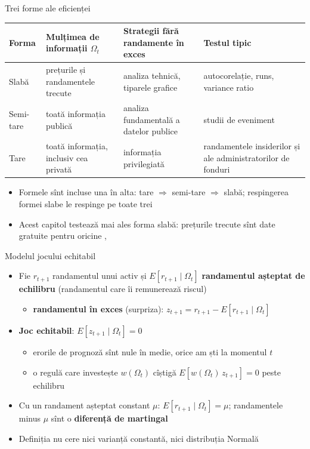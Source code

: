 \begin{frame}{Trei forme ale eficienței}
\itemsize{\small}
\begin{center}
\footnotesize
\begin{tabular}{>{\raggedright\arraybackslash}p{1.8cm}>{\raggedright\arraybackslash}p{3.2cm}>{\raggedright\arraybackslash}p{3.0cm}>{\raggedright\arraybackslash}p{2.9cm}}
\toprule
\textbf{Forma} & \textbf{Mulțimea de informații $\Omega_t$} & \textbf{Strategii fără randamente în exces} & \textbf{Testul tipic} \\
\midrule
Slabă & prețurile și randamentele trecute & analiza tehnică, tiparele grafice & autocorelație, runs, variance ratio \\
Semi-tare & toată informația publică & analiza fundamentală a datelor publice & studii de eveniment \\
Tare & toată informația, inclusiv cea privată & informația privilegiată & randamentele insiderilor și ale administratorilor de fonduri \\
\bottomrule
\end{tabular}
\end{center}
\begin{itemize}
    \item Formele sînt incluse una în alta: tare $\Rightarrow$ semi-tare $\Rightarrow$ slabă; respingerea formei slabe le respinge pe toate trei
    \item Acest capitol testează mai ales forma slabă: prețurile trecute sînt date gratuite pentru oricine , 
\end{itemize}
\end{frame}

\begin{frame}{Modelul jocului echitabil}
\itemsize{\small}
\begin{itemize}
    \item Fie $r_{t+1}$ randamentul unui activ și $E[r_{t+1} \mid \Omega_t]$ \textbf{randamentul așteptat de echilibru} (randamentul care îi remunerează riscul)
    \begin{itemize}
        \item \textbf{randamentul în exces} (surpriza): $z_{t+1} = r_{t+1} - E[r_{t+1} \mid \Omega_t]$
    \end{itemize}
    \item \textbf{Joc echitabil}: $E[z_{t+1} \mid \Omega_t] = 0$
    \begin{itemize}
        \item erorile de prognoză sînt nule în medie, orice am ști la momentul $t$
        \item o regulă care investește $w(\Omega_t)$ cîștigă $E[w(\Omega_t)\, z_{t+1}] = 0$ peste echilibru
    \end{itemize}
    \item Cu un randament așteptat constant $\mu$: $E[r_{t+1} \mid \Omega_t] = \mu$; randamentele minus $\mu$ sînt o \textbf{diferență de martingal}
    \item Definiția nu cere nici varianță constantă, nici distribuția Normală
\end{itemize}
\end{frame}

